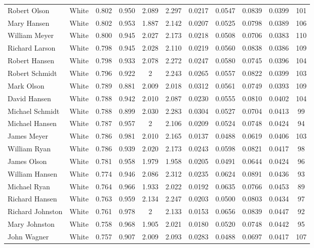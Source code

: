 \documentclass[]{article}
\begin{document}
\begin{tabular}{lcccccccccc}
Robert Olson & White & 0.802 & 0.950 & 2.089 & 2.297 & 0.0217 & 0.0547 & 0.0839 & 0.0399 & 101 \\
Mary Hansen & White & 0.802 & 0.953 & 1.887 & 2.142 & 0.0207 & 0.0525 & 0.0798 & 0.0389 & 106 \\
William Meyer & White & 0.800 & 0.945 & 2.027 & 2.173 & 0.0218 & 0.0508 & 0.0706 & 0.0383 & 110 \\
Richard Larson & White & 0.798 & 0.945 & 2.028 & 2.110 & 0.0219 & 0.0560 & 0.0838 & 0.0386 & 109 \\
Robert Hansen & White & 0.798 & 0.933 & 2.078 & 2.272 & 0.0247 & 0.0580 & 0.0745 & 0.0396 & 104 \\
Robert Schmidt & White & 0.796 & 0.922 & 2 & 2.243 & 0.0265 & 0.0557 & 0.0822 & 0.0399 & 103 \\
Mark Olson & White & 0.789 & 0.881 & 2.009 & 2.018 & 0.0312 & 0.0561 & 0.0749 & 0.0393 & 109 \\
David Hansen & White & 0.788 & 0.942 & 2.010 & 2.087 & 0.0230 & 0.0555 & 0.0810 & 0.0402 & 104 \\
Michael Schmidt & White & 0.788 & 0.899 & 2.030 & 2.283 & 0.0304 & 0.0527 & 0.0704 & 0.0413 & 99 \\
Michael Hansen & White & 0.787 & 0.957 & 2 & 2.106 & 0.0209 & 0.0524 & 0.0748 & 0.0424 & 94 \\
James Meyer & White & 0.786 & 0.981 & 2.010 & 2.165 & 0.0137 & 0.0488 & 0.0619 & 0.0406 & 103 \\
William Ryan & White & 0.786 & 0.939 & 2.020 & 2.173 & 0.0243 & 0.0598 & 0.0821 & 0.0417 & 98 \\
James Olson & White & 0.781 & 0.958 & 1.979 & 1.958 & 0.0205 & 0.0491 & 0.0644 & 0.0424 & 96 \\
William Hansen & White & 0.774 & 0.946 & 2.086 & 2.312 & 0.0235 & 0.0624 & 0.0891 & 0.0436 & 93 \\
Michael Ryan & White & 0.764 & 0.966 & 1.933 & 2.022 & 0.0192 & 0.0635 & 0.0766 & 0.0453 & 89 \\
Richard Hansen & White & 0.763 & 0.959 & 2.134 & 2.247 & 0.0203 & 0.0500 & 0.0803 & 0.0434 & 97 \\
Richard Johnston & White & 0.761 & 0.978 & 2 & 2.133 & 0.0153 & 0.0656 & 0.0839 & 0.0447 & 92 \\
Mary Johnston & White & 0.758 & 0.968 & 1.905 & 2.021 & 0.0180 & 0.0520 & 0.0748 & 0.0442 & 95 \\
John Wagner & White & 0.757 & 0.907 & 2.009 & 2.093 & 0.0283 & 0.0488 & 0.0697 & 0.0417 & 107 \\

\end{tabular}
\end{document}
